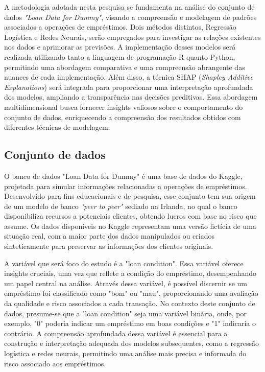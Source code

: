 A metodologia adotada nesta pesquisa se fundamenta na análise do conjunto de dados \textit{"Loan Data for Dummy"}, 
visando a compreensão e modelagem de padrões associados a operações de empréstimos. Dois métodos distintos, 
Regressão Logística e Redes Neurais, serão empregados para investigar as relações existentes nos dados e aprimorar as previsões.
A implementação desses modelos será realizada utilizando tanto a linguagem de programação R quanto Python,
permitindo uma abordagem comparativa e uma compreensão abrangente das nuances de cada implementação.
Além disso, a técnica SHAP (\textit{Shapley Additive Explanations}) será integrada para proporcionar
uma interpretação aprofundada dos modelos, ampliando a transparência nas decisões preditivas. 
Essa abordagem multidimensional busca fornecer insights valiosos sobre o comportamento do conjunto de dados, 
enriquecendo a compreensão dos resultados obtidos com diferentes técnicas de modelagem.


\subsection{Conjunto de dados}

O banco de dados "Loan Data for Dummy" é uma base de dados do Kaggle, projetada para simular informações relacionadas 
a operações de empréstimos. Desenvolvido para fins educacionais e de pesquisa, esse conjunto tem sua origem de um modelo de 
banco \textit{"peer to peer"} sediado na Irlanda, no qual o banco disponibiliza recursos a potenciais clientes, 
obtendo lucros com base no risco que assume. 
Os dados disponíveis no Kaggle representam uma versão fictícia de uma situação real, com a maior parte dos dados manipulados
ou criados sinteticamente para preservar as informações dos clientes originais.

A variável que será foco do estudo é a "loan condition". Essa variável oferece insights cruciais,
uma vez que reflete a condição do empréstimo, desempenhando um papel central na análise. Através dessa variável, é 
possível discernir se um empréstimo foi classificado como "bom" ou "mau", proporcionando uma avaliação da qualidade e 
risco associados a cada transação. No contexto deste conjunto de dados, presume-se que a "loan condition" seja uma variável binária,
onde, por exemplo, "0" poderia indicar um empréstimo em boas condições e "1" indicaria o contrário.
A compreensão aprofundada dessa variável é essencial para a construção e interpretação adequada dos modelos subsequentes, 
como a regressão logística e redes neurais, permitindo uma análise mais precisa e informada do risco associado aos empréstimos.

